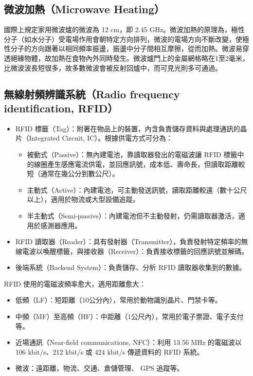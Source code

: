 \documentclass[a4paper,12pt]{report}
\begin{document}
\begin{itemize}
\subsection{微波加熱（Microwave Heating）}
國際上規定家用微波爐的微波為 12 cm，即 2.45 GHz。微波加熱的原理為，極性分子（如水分子）受電場作用會朝特定方向排列，微波的電場方向不斷改變，使極性分子的方向跟著以相同頻率振盪，振盪中分子間相互摩擦，從而加熱。微波易穿透絕緣物體，故加熱在食物內外同時發生。微波爐門上的金屬網格略在1至2毫米，比微波波長短很多，故多數微波會被反射回爐中，而可見光則多可通過。
\subsection{無線射頻辨識系統（Radio frequency identification, RFID）}
\begin{itemize}
\item RFID 標籤（Tag）：附著在物品上的裝置，內含負責儲存資料與處理通訊的晶片（Integrated Circuit, IC）。根據供電方式可分為：
\begin{itemize}
\item 被動式（Passive）：無內建電池，靠讀取器發出的電磁波讓 RFID 標籤中的線圈產生感應電流供電，並回應訊號，成本低、壽命長，但讀取距離較短（通常在幾公分到數公尺）。
\item 主動式（Active）：內建電池，可主動發送訊號，讀取距離較遠（數十公尺以上），適用於物流或大型設備追蹤。
\item 半主動式（Semi-passive）：內建電池但不主動發射，仍需讀取器激活，適用於感測器應用。
\end{itemize}
\item RFID 讀取器（Reader）：具有發射器（Transmitter），負責發射特定頻率的無線電波以喚醒標籤，與接收器（Receiver）：負責接收標籤的回應訊號並解碼。
\item 後端系統（Backend System）：負責儲存、分析 RFID 讀取器收集到的數據。
\end{itemize}
RFID 使用的電磁波頻率愈大，適用距離愈大：
\begin{itemize}
\item 低頻（LF）：短距離（10公分內），常用於動物識別晶片、門禁卡等。
\item 中頻（MF）至高頻（HF）：中距離（1公尺內），常用於電子票證、電子支付等。
\item 近場通訊（Near-field communications, NFC）：利用 13.56 MHz 的電磁波以 106 kbit/s、212 kbit/s 或 424 kbit/s 傳遞資料的 RFID 系統。
\item 微波：遠距離，物流、交通、倉儲管理、 GPS 追蹤等。
\end{itemize}



\end{itemize}
\end{document}
